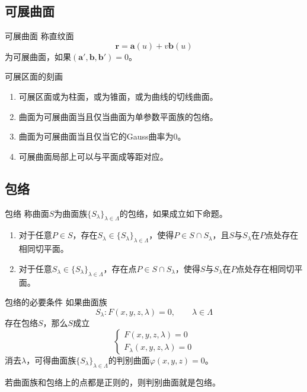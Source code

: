 \documentclass[lang = cn, scheme = chinese, thmcnt = section]{elegantbook}
\newcommand{\bs}{\boldsymbol}          %
\begin{document}
\subsection{可展曲面}

\begin{definition}{可展曲面}
	称直纹面
	$$
	\bs{r}=\bs{a}(u)+v\bs{b}(u)
	$$
	为可展曲面，如果$(\bs{a}',\bs{b},\bs{b}')=0$。
\end{definition}

\begin{theorem}{可展区面的刻画}
	\begin{enumerate}
		\item 可展区面或为柱面，或为锥面，或为曲线的切线曲面。
		\item 曲面为可展曲面当且仅当曲面为单参数平面族的包络。
		\item 曲面为可展曲面当且仅当它的Gauss曲率为$0$。
		\item 可展曲面局部上可以与平面成等距对应。
	\end{enumerate}
\end{theorem}

\subsection{包络}

\begin{definition}{包络}
	称曲面$S$为曲面族$\{S_\lambda\}_{\lambda\in\Lambda}$的包络，如果成立如下命题。
	\begin{enumerate}
		\item 对于任意$P\in S$，存在$S_\lambda\in \{S_\lambda\}_{\lambda\in\Lambda}$，使得$P\in S\cap S_\lambda$，且$S$与$S_\lambda$在$P$点处存在相同切平面。
		\item 对于任意$S_\lambda\in \{S_\lambda\}_{\lambda\in\Lambda}$，存在点$P\in S\cap S_\lambda$，使得$S$与$S_\lambda$在$P$点处存在相同切平面。
	\end{enumerate}
\end{definition}

\begin{theorem}{包络的必要条件}
	如果曲面族
	$$
	S_\lambda:F(x,y,z,\lambda)=0,\qquad \lambda\in\Lambda
	$$
	存在包络$S$，那么$S$成立%
	$$
	\begin{cases}
		F(x,y,z,\lambda)=0\\
		F_\lambda(x,y,z,\lambda)=0
	\end{cases}
	$$
	消去$\lambda$，可得曲面族$\{S_\lambda\}_{\lambda\in\Lambda}$的判别曲面$\varphi(x,y,z)=0$。
	
	若曲面族和包络上的点都是正则的，则判别曲面就是包络。
\end{theorem}
\end{document}
